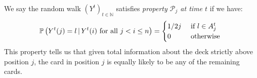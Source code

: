 \documentclass[11pt]{report}
\begin{document}
\begin{defn}
	We say the random walk $(Y^{t})_{t\in \mathbb{N}}$ satisfies \emph{property $\mathcal{P}_{j}$ at time $t$} if we have:
	\begin{eqnarray}
	\mathbb{P}\left(Y^{t} (j) = l \, | \, Y^{t}(i) \textnormal{ for all } j < i \leq n \right) = 
	\begin{cases}
	1/2j & \textnormal{ if } l \in A_{j}^{t} \\
	0 & \textnormal{ otherwise } 
	\end{cases} \label{chpt6:eqn:propertyj}
	\end{eqnarray} 
	This property tells us that given total information about the deck strictly above position $j$, the card in position $j$ is equally likely to be any of the remaining cards.
\end{defn}
\end{document}

